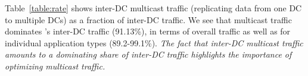 Table~\ref{table:rate} shows inter-DC multicast traffic 
(replicating data from one DC to multiple DCs) as
a fraction of inter-DC traffic.
We see that multicast traffic dominates \company's
inter-DC traffic (91.13\%), in terms of overall traffic as well
as for individual application types (89.2-99.1\%).
{\em The fact that inter-DC multicast traffic
amounts to a dominating share of inter-DC traffic
highlights the importance of optimizing multicast
traffic.}

